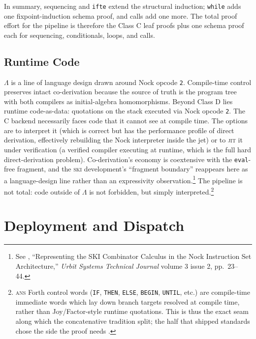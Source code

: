 \documentclass[twoside]{article}
\begin{document}
In summary, sequencing and \lstinline[style=inlinecode]{ifte} extend the structural induction; \lstinline[style=inlinecode]{while} adds one fixpoint-induction schema proof, and calls add one more.  The total proof effort for the pipeline is therefore the Class C leaf proofs plus one schema proof each for sequencing, conditionals, loops, and calls.

\subsection{Runtime Code}

$\Lambda$ is a line of language design drawn around Nock opcode \lstinline[style=inlinecode]{2}.  Compile-time control preserves intact co-derivation because the source of truth is the program tree with both compilers as initial-algebra homomorphisms.  Beyond Class D lies runtime code-as-data: quotations on the stack executed via Nock opcode \lstinline[style=inlinecode]{2}.  The C backend necessarily faces code that it cannot see at compile time.  The options are to interpret it (which is correct but has the performance profile of direct derivation, effectively rebuilding the Nock interpreter inside the jet) or to \textsc{jit} it under verification (a verified compiler executing at runtime, which is the full hard direct-derivation problem).  Co-derivation's economy is coextensive with the \lstinline[style=inlinecode]{eval}-free fragment, and the \textsc{ski} development's ``fragment boundary'' reappears here as a language-design line rather than an expressivity observation.\footnote{See , ``Representing the SKI Combinator Calculus in the Nock Instruction Set Architecture,'' \emph{Urbit Systems Technical Journal} volume 3 issue 2, pp.~23--44.}  The pipeline is not total:  code outside of $\Lambda$ is not forbidden, but simply interpreted.\footnote{\textsc{ans} Forth control words (\texttt{IF}, \texttt{THEN}, \texttt{ELSE}, \texttt{BEGIN}, \texttt{UNTIL}, etc.) are compile-time immediate words which lay down branch targets resolved at compile time, rather than Joy/Factor-style runtime quotations.  This is thus the exact seam along which the concatenative tradition split; the half that shipped standards chose the side the proof needs \citep{dpans94}.}

\section{Deployment and Dispatch}
\end{document}
